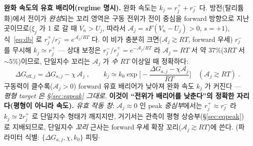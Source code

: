 \documentclass[11pt,a4paper]{article}
\newcommand{\eff}{\mathrm{eff}}
\begin{document}
\textbf{완화 속도의 유효 배리어(regime 명시).} 완화 속도는 $k_j=r_j^++r_j^-$ 다. 방전(탈리튬화)에서 전이가
\emph{완성}되는 꼬리 영역은 구동 전위가 전이 중심을 forward 방향으로 지난 곳이므로($\xi_j$ 가 1 로 갈 때
$V_n>U_j$, 따라서 $\mathcal A_j=sF(V_n-U_j)>0$, $s=+1$), 식~\eqref{eq:db} 로 $r_j^+/r_j^-=e^{\mathcal A_j/RT}$ 다.
이 비가 충분히 크면($\mathcal A_j\gtrsim RT$, forward 우세) $r_j^-$ 를 무시해 $k_j\simeq r_j^+$ — 상대 보정은
$r_j^-/r_j^+=e^{-\mathcal A_j/RT}$ 라 $\mathcal A_j=RT$ 서 약 $37\%$($3RT$ 서 $\sim5\%$)이므로, 단일지수 꼬리는 $\mathcal A_j$ 가
\emph{수 $RT$} 이상일 때 정확하다:
\begin{equation}
\boxed{\;\Delta G_{\eff,j}=\Delta G_{a,j}-\chi\,\mathcal A_j\;,\qquad
k_j\simeq k_0\exp\!\Big[-\frac{\Delta G_{a,j}-\chi\mathcal A_j}{RT}\Big]\quad(\mathcal A_j\gtrsim RT)\;.}
\label{eq:keff}
\end{equation}
구동력이 클수록($\mathcal A_j>0$) forward 유효 배리어가 낮아져 완화 속도 $k_j$ 가 커진다 — \emph{평형 target 은
\S\ref{sec:eqpeak} 그대로}. \textbf{이것이 ``전위가 배리어를 낮춘다''의 정확한 자리다(평형이 아니라 속도).}
\emph{유효 작동 창}: $\mathcal A_j\approx0$ 인 peak \emph{중심부}에서는 $r_j^+\approx r_j^-$ 라 $k_j\simeq2r_j^+$ 로
단일지수 형태가 깨지지만, 거기서는 관측이 평형 상승부(\S\ref{sec:eqpeak})로 지배되므로, 단일지수 \emph{꼬리}
근사는 forward 우세 확장 꼬리($\mathcal A_j\gtrsim RT$)에 쓴다. (파라미터 식별: $\{\Delta G_{a,j},\chi,k_0\}$ 피팅$\cdot$
\end{document}
